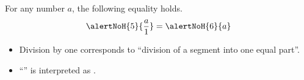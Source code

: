 \begin{frame}
\begin{observation}
For any number $a$, the following equality holds. 
\[
\alertNoH{5}{\frac{a}{1}} =\alertNoH{6}{ a}
\]
\end{observation}
\begin{itemize}
\item<4-> Division by one corresponds to ``division of a segment into one equal part''. 
\item<5-> ``'' is interpreted as .

\end{itemize}
\end{frame}
